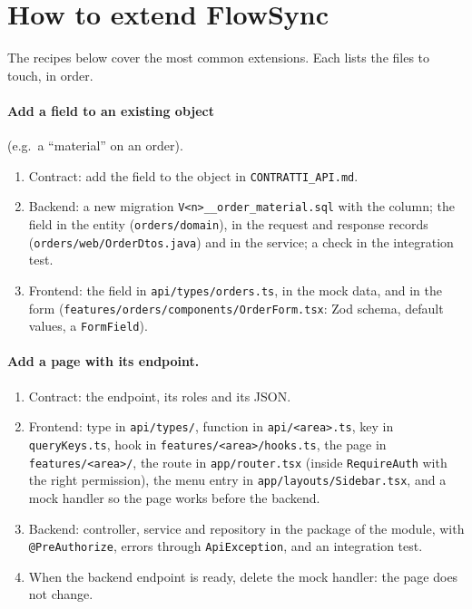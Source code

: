 \section{How to extend FlowSync}
\label{sec:dev-extend}

The recipes below cover the most common extensions. Each lists the files to touch, in order.

\paragraph{Add a field to an existing object} (e.g.\ a ``material'' on an order).
\begin{enumerate}
  \item Contract: add the field to the object in \texttt{CONTRATTI\_API.md}.
  \item Backend: a new migration \texttt{V<n>\_\_order\_material.sql} with the column; the field
        in the entity (\texttt{orders/domain}), in the request and response records
        (\texttt{orders/web/OrderDtos.java}) and in the service; a check in the integration test.
  \item Frontend: the field in \texttt{api/types/orders.ts}, in the mock data, and in the form
        (\texttt{features/orders/components/OrderForm.tsx}: Zod schema, default values, a
        \texttt{FormField}).
\end{enumerate}

\paragraph{Add a page with its endpoint.}
\begin{enumerate}
  \item Contract: the endpoint, its roles and its JSON.
  \item Frontend: type in \texttt{api/types/}, function in \texttt{api/<area>.ts}, key in
        \texttt{queryKeys.ts}, hook in \texttt{features/<area>/hooks.ts}, the page in
        \texttt{features/<area>/}, the route in \texttt{app/router.tsx} (inside
        \texttt{RequireAuth} with the right permission), the menu entry in
        \texttt{app/layouts/Sidebar.tsx}, and a mock handler so the page works before the
        backend.
  \item Backend: controller, service and repository in the package of the module, with
        \texttt{@PreAuthorize}, errors through \texttt{ApiException}, and an integration test.
  \item When the backend endpoint is ready, delete the mock handler: the page does not change.
\end{enumerate}

